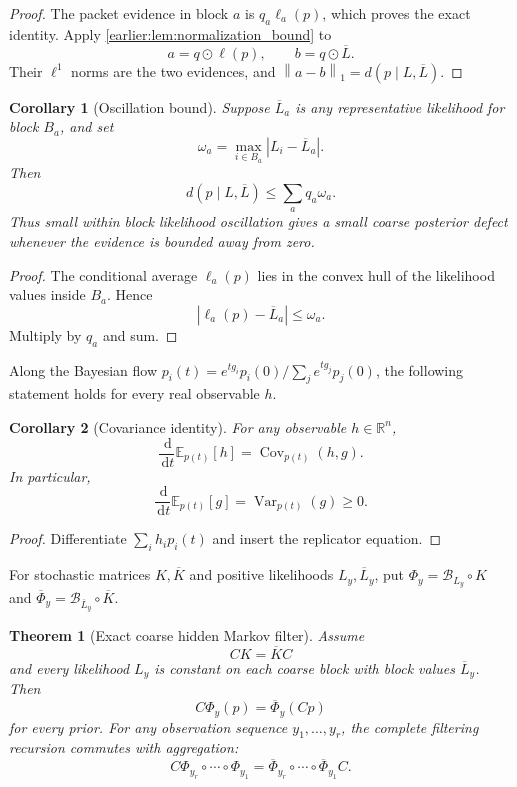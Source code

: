 \documentclass[11pt,letterpaper]{article}
\newtheorem{theorem}{Theorem}[section]
\theoremstyle{plain}
\theoremstyle{plain}
\theoremstyle{plain}
\newtheorem{corollary}[corollary]{Corollary}
\theoremstyle{definition}
\theoremstyle{definition}
\theoremstyle{definition}
\theoremstyle{definition}
\theoremstyle{definition}
\theoremstyle{remark}
\theoremstyle{remark}
\theoremstyle{remark}
\theoremstyle{remark}
\theoremstyle{remark}
\newcommand{\Var}{\operatorname{Var}}
\newcommand{\Cov}{\operatorname{Cov}}
\newcommand{\norm}[1]{\left\lVert#1\right\rVert}
\theoremstyle{remark}
\newcommand{\RR}{\mathbb R}
\newcommand{\Bcal}{\mathcal B}
\newcommand{\dd}{\,\mathrm d}
\newcommand{\abs}[1]{\left\lvert#1\right\rvert}
\newcommand{\EE}{\mathbb E}
\let\KomorebiPrimitiveMathcal\mathcal
\renewcommand{\mathcal}[1]{{\KomorebiPrimitiveMathcal{#1}}}
\let\KomorebiPrimitivemathbb\mathbb
\renewcommand{\mathbb}[1]{{\KomorebiPrimitivemathbb{#1}}}
\let\KomorebiPrimitivemathrm\mathrm
\renewcommand{\mathrm}[1]{{\KomorebiPrimitivemathrm{#1}}}
\begin{document}
\begin{proof}
The packet evidence in block \(a\) is \(q_a\ell_a(p)\), which proves the exact identity. Apply \cref{earlier:lem:normalization_bound} to
\[
a=q\odot\ell(p),
\qquad
b=q\odot\overline L.
\]
Their \(\ell^1\) norms are the two evidences, and \(\norm{a-b}_1=d(p\mid L,\overline L)\).
\end{proof}

\begin{corollary}[Oscillation bound]\label{earlier:record:014}\label{earlier:cor:bayes_oscillation}
Suppose \(\overline L_a\) is any representative likelihood for block \(B_a\), and set
\[
\omega_a
=
\max_{i\in B_a}\abs{L_i-\overline L_a}.
\]
Then
\[
d(p\mid L,\overline L)
\leq
\sum_aq_a\omega_a.
\]
Thus small within block likelihood oscillation gives a small coarse posterior defect whenever the evidence is bounded away from zero.
\end{corollary}

\begin{proof}
The conditional average \(\ell_a(p)\) lies in the convex hull of the likelihood values inside \(B_a\). Hence
\[
\abs{\ell_a(p)-\overline L_a}\leq\omega_a.
\]
Multiply by \(q_a\) and sum.
\end{proof}


Along the Bayesian flow $p_i(t)=e^{tg_i}p_i(0)/\sum_j e^{tg_j}p_j(0)$, the following statement holds for every real observable $h$.
\begin{corollary}[Covariance identity]\label{earlier:record:015}\label{earlier:cor:bayesian_covariance}
For any observable \(h\in\RR^n\),
\[
\frac{\dd}{\dd t}\EE_{p(t)}[h]
=
\Cov_{p(t)}(h,g).
\]
In particular,
\[
\frac{\dd}{\dd t}\EE_{p(t)}[g]
=
\Var_{p(t)}(g)\geq0.
\]
\end{corollary}

\begin{proof}
Differentiate \(\sum_ih_ip_i(t)\) and insert the replicator equation.
\end{proof}


For stochastic matrices $K,\overline K$ and positive likelihoods $L_y,\overline L_y$, put $\Phi_y=\Bcal_{L_y}\circ K$ and $\overline\Phi_y=\Bcal_{\overline L_y}\circ\overline K$.
\begin{theorem}[Exact coarse hidden Markov filter]\label{earlier:record:016}\label{earlier:thm:exact_coarse_filter}
Assume
\[
CK=\overline KC
\]
and every likelihood \(L_y\) is constant on each coarse block with block values \(\overline L_y\). Then
\[
C\Phi_y(p)=\overline\Phi_y(Cp)
\]
for every prior. For any observation sequence \(y_1,\ldots,y_r\), the complete filtering recursion commutes with aggregation:
\[
C\Phi_{y_r}\circ\cdots\circ\Phi_{y_1}
=
\overline\Phi_{y_r}\circ\cdots\circ\overline\Phi_{y_1}C.
\]
\end{theorem}
\end{document}
